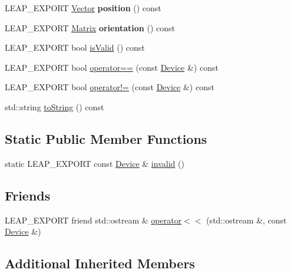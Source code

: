\begin{DoxyCompactItemize}
L\+E\+A\+P\+\_\+\+E\+X\+P\+O\+RT \hyperlink{struct_leap_1_1_vector}{Vector} {\bfseries position} () const
\item 
\mbox{\label{class_leap_1_1_device_a6dcf36d277abbb92eabf44f8dcc55829}} 
L\+E\+A\+P\+\_\+\+E\+X\+P\+O\+RT \hyperlink{struct_leap_1_1_matrix}{Matrix} {\bfseries orientation} () const
\item 
L\+E\+A\+P\+\_\+\+E\+X\+P\+O\+RT bool \hyperlink{class_leap_1_1_device_a3de3767cbfc2a4f24cefa99d363d15ea}{is\+Valid} () const
\item 
L\+E\+A\+P\+\_\+\+E\+X\+P\+O\+RT bool \hyperlink{class_leap_1_1_device_a38a95c6aa2b58719e4202eb8e6e2051d}{operator==} (const \hyperlink{class_leap_1_1_device}{Device} \&) const
\item 
L\+E\+A\+P\+\_\+\+E\+X\+P\+O\+RT bool \hyperlink{class_leap_1_1_device_aac05d238cd18a9d790d65adcf328cd96}{operator!=} (const \hyperlink{class_leap_1_1_device}{Device} \&) const
\item 
std\+::string \hyperlink{class_leap_1_1_device_adf422b605542a30dba4400d4ec8e4890}{to\+String} () const
\end{DoxyCompactItemize}
\subsection*{Static Public Member Functions}
\begin{DoxyCompactItemize}
\item 
static L\+E\+A\+P\+\_\+\+E\+X\+P\+O\+RT const \hyperlink{class_leap_1_1_device}{Device} \& \hyperlink{class_leap_1_1_device_a4a87905142db30a40b47b428db495db6}{invalid} ()
\end{DoxyCompactItemize}
\subsection*{Friends}
\begin{DoxyCompactItemize}
\item 
L\+E\+A\+P\+\_\+\+E\+X\+P\+O\+RT friend std\+::ostream \& \hyperlink{class_leap_1_1_device_a5296f0c6d7b410e2ffc23c6e74a507ec}{operator$<$$<$} (std\+::ostream \&, const \hyperlink{class_leap_1_1_device}{Device} \&)
\end{DoxyCompactItemize}
\subsection*{Additional Inherited Members}


